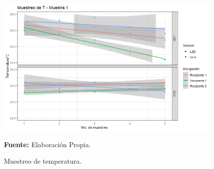 \begin{figure}[H]
        \centering
        \includegraphics[width=0.75\linewidth]{Imagenes/cap4/T_M1.png}
        \caption {Muestreo de temperatura. }{\textbf{Fuente:}
        Elaboraci\'on Propia. }
        \label{fig:M1T}
    \end{figure}
    
